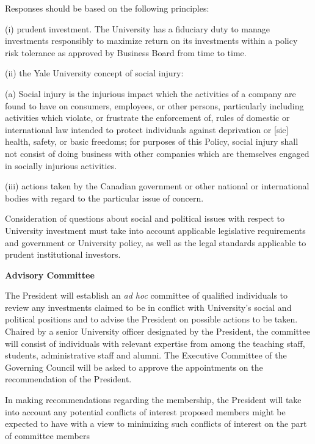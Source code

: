\documentclass[10pt]{article}
\begin{document}
 

Responses should be based on the following principles:



(i) prudent investment. The University has a fiduciary duty to manage investments responsibly to maximize return on its investments within a policy risk tolerance as approved by Business Board from time to time.

 


(ii) the Yale University concept of social injury:

 

(a) Social injury is the injurious impact which the activities of a company are found to have on consumers, employees, or other persons, particularly including activities which violate, or frustrate the enforcement of, rules of domestic or international law intended to protect individuals against deprivation or [sic] health, safety, or basic freedoms; for purposes of this Policy, social injury shall not consist of doing business with other companies which are themselves engaged in socially injurious activities.

 

(iii) actions taken by the Canadian government or other national or international bodies with regard to the particular issue of concern.

 

Consideration of questions about social and political issues with respect to University investment must take into account applicable legislative requirements and government or University policy, as well as the legal standards applicable to prudent institutional investors.




\textbf{Advisory Committee}

 

The President will establish an \emph{ad hoc} committee of qualified individuals to review any investments claimed to be in conflict with University’s social and political positions and to advise the President on possible actions to be taken.  Chaired by a senior University officer designated by the President, the committee will consist of individuals with relevant expertise from among the teaching staff, students, administrative staff and alumni.  The Executive Committee of the Governing Council will be asked to approve the appointments on the recommendation of the President.

 

In making recommendations regarding the membership, the President will take into account any potential conflicts of interest proposed members might be expected to have with a view to minimizing such conflicts of interest on the part of committee members
\end{document}
